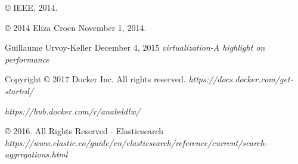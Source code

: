
\label{app:bibliography} %



\begin{thebibliography}{Bibliography}
© IEEE, 2014.

© 2014 Eliza Croen November 1, 2014.

Guillaume Urvoy-Keller December 4, 2015	\textit{virtualization-A highlight on performance} 

Copyright © 2017 Docker Inc. All rights reserved.	\textit{https://docs.docker.com/get-started/}

\textit{https://hub.docker.com/r/anabeldlw/}


© 2016. All Rights Reserved - Elasticsearch
\textit{https://www.elastic.co/guide/en/elasticsearch/reference/current/search-aggregations.html}
\end{thebibliography}

